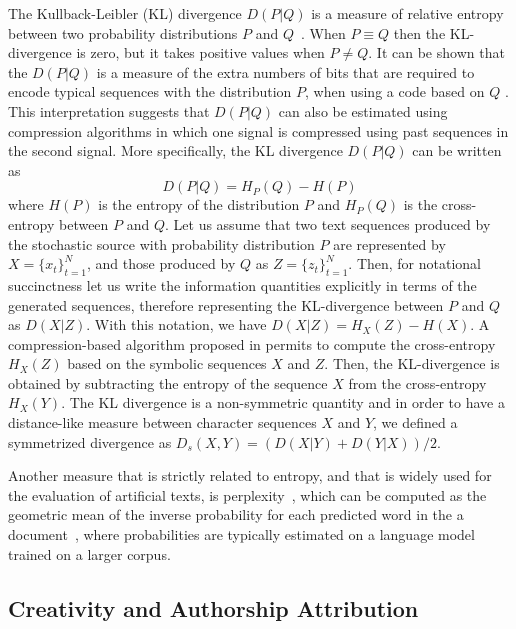 \documentclass[journal]{IEEEtran}
\begin{document}
The Kullback-Leibler (KL) divergence $D(P|Q)$ is a measure of relative entropy
between
two probability distributions $P$ and $Q$~\cite{Cover2006}. When $P\equiv Q$
then the KL-divergence is zero, but it takes positive values when $P\ne Q$. It
can be
shown that the $D(P|Q)$ is a measure of the extra numbers of bits that are
required to encode typical sequences with
the distribution $P$, when using a code based on $Q$ \cite{Cover2006}. This
interpretation suggests that $D(P|Q)$ can also be estimated
using compression algorithms in which one signal is compressed using past
sequences in the second signal. More specifically, the KL divergence $D(P|Q)$ can
be written
as~\cite{Cover2006}
%
\begin{equation}
D(P|Q)=H_P(Q)-H(P)
\end{equation}
%
where $H(P)$ is the entropy of the distribution $P$ and $H_P(Q)$ is
the cross-entropy between $P$ and $Q$. Let us assume that two text sequences
produced by the stochastic source with probability distribution
$P$ are represented by $X=\{x_t\}_{t=1}^N$, and those produced by $Q$ as
$Z=\{z_t\}_{t=1}^N$. Then, for notational succinctness let us write the
information
quantities explicitly in terms of the generated sequences, therefore
representing the KL-divergence between $P$ and $Q$ as $D(X|Z)$. With this
notation,
we have $D(X|Z)=H_X(Z)-H(X)$. A compression-based algorithm
proposed in \cite{Ziv1993} permits to compute the cross-entropy $H_X(Z)$ based
on the symbolic sequences $X$ and $Z$. Then, the KL-divergence
is obtained by subtracting the entropy of the sequence $X$ from the
cross-entropy $H_X(Y)$.  The KL divergence is a non-symmetric quantity and in
order
to have a distance-like measure between character sequences $X$ and $Y$, we
defined a symmetrized divergence as $D_s(X,Y)=(D(X|Y)+D(Y|X))/2$.

Another measure that is strictly related to entropy, and that is widely used
for the evaluation of artificial texts, is perplexity~\cite{Jelinek1977}, which
can be computed as the geometric mean of the inverse probability for each
predicted word in the a document~\cite{Bengio2003,Vinyals2015}, where
probabilities are typically estimated on a language model trained on a larger
corpus.



\subsection{Creativity and Authorship Attribution}
\label{sec:creativity}
\end{document}
